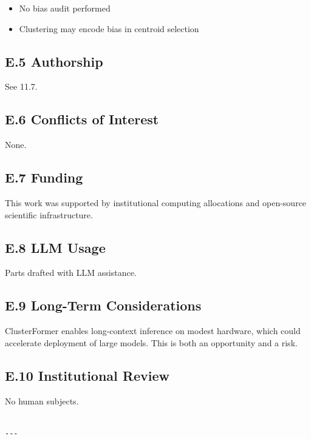 \begin{itemize}
\item No bias audit performed
\item Clustering may encode bias in centroid selection

\end{itemize}
\subsection{E.5 Authorship}

See  11.7.

\subsection{E.6 Conflicts of Interest}

None.

\subsection{E.7 Funding}

This work was supported by institutional computing allocations and open-source scientific infrastructure.

\subsection{E.8 LLM Usage}

Parts drafted with LLM assistance.

\subsection{E.9 Long-Term Considerations}

ClusterFormer enables long-context inference on modest hardware, which 
could accelerate deployment of large models. This is both an opportunity 
and a risk.

\subsection{E.10 Institutional Review}

No human subjects.
\begin{lstlisting}

---
\end{lstlisting}